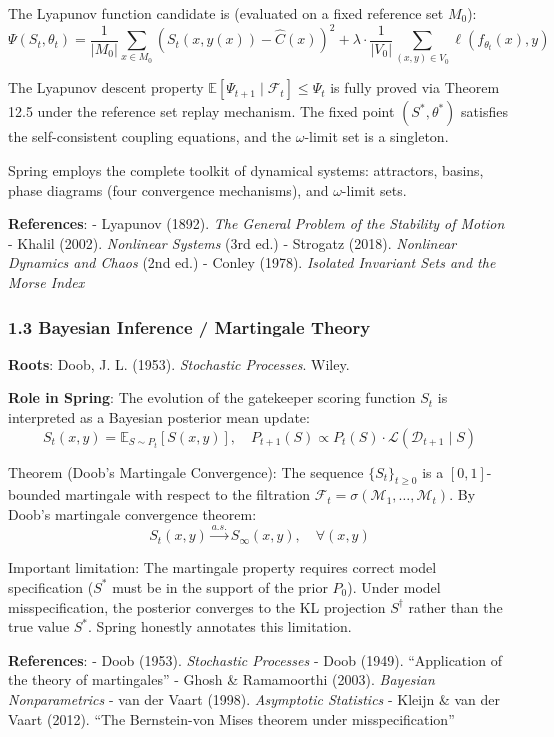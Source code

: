 \documentclass[
  12pt,
]{article}
\begin{document}
The Lyapunov function candidate is (evaluated on a fixed reference set $M_0$):
\[\Psi(S_t, \theta_t) = \frac{1}{|M_0|} \sum_{x \in M_0} (S_t(x, y(x)) - \hat{C}(x))^2 + \lambda \cdot \frac{1}{|V_0|} \sum_{(x,y) \in V_0} \ell(f_{\theta_t}(x), y)\]

The Lyapunov descent property $\mathbb{E}[\Psi_{t+1} \mid \mathcal{F}_t] \leq \Psi_t$ is fully proved via Theorem 12.5 under the reference set replay mechanism. The fixed point $(S^*, \theta^*)$ satisfies the self-consistent coupling equations, and the $\omega$-limit set is a singleton.

Spring employs the complete toolkit of dynamical systems: attractors, basins, phase diagrams (four convergence mechanisms), and $\omega$-limit sets.

\textbf{References}: - Lyapunov (1892). \emph{The General Problem of the Stability of Motion} - Khalil (2002). \emph{Nonlinear Systems} (3rd ed.) - Strogatz (2018). \emph{Nonlinear Dynamics and Chaos} (2nd ed.) - Conley (1978). \emph{Isolated Invariant Sets and the Morse Index}

\subsubsection{1.3 Bayesian Inference / Martingale Theory}\label{bayesian-inference-martingale}

\textbf{Roots}: Doob, J. L. (1953). \emph{Stochastic Processes}. Wiley.

\textbf{Role in Spring}: The evolution of the gatekeeper scoring function $S_t$ is interpreted as a Bayesian posterior mean update:
\[S_t(x,y) = \mathbb{E}_{S \sim P_t}[S(x,y)], \quad P_{t+1}(S) \propto P_t(S) \cdot \mathcal{L}(\mathcal{D}_{t+1} \mid S)\]

Theorem (Doob's Martingale Convergence): The sequence $\{S_t\}_{t \geq 0}$ is a $[0,1]$-bounded martingale with respect to the filtration $\mathcal{F}_t = \sigma(\mathcal{M}_1, \dots, \mathcal{M}_t)$. By Doob's martingale convergence theorem:
\[S_t(x,y) \xrightarrow{a.s.} S_\infty(x,y), \quad \forall (x,y)\]

Important limitation: The martingale property requires correct model specification ($S^*$ must be in the support of the prior $P_0$). Under model misspecification, the posterior converges to the KL projection $S^\dagger$ rather than the true value $S^*$. Spring honestly annotates this limitation.

\textbf{References}: - Doob (1953). \emph{Stochastic Processes} - Doob (1949). ``Application of the theory of martingales'' - Ghosh \& Ramamoorthi (2003). \emph{Bayesian Nonparametrics} - van der Vaart (1998). \emph{Asymptotic Statistics} - Kleijn \& van der Vaart (2012). ``The Bernstein-von Mises theorem under misspecification''
\end{document}
